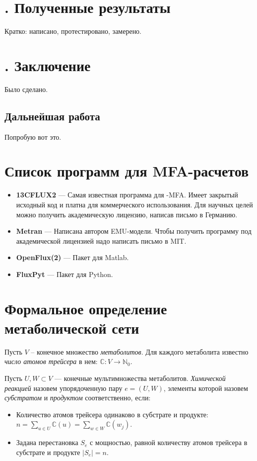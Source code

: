 \documentclass[14pt, a4paper]{extreport}
\begin{document}
\chapter[Полученные результаты]{\thechapter{}. Полученные результаты}
Кратко: написано, протестировано, замерено.

\chapter[Заключение]{\thechapter{}. Заключение}
Было сделано. 
\section{Дальнейшая работа}
Попробую вот это.


\begin{appendices}
	\chapter{Список программ для MFA-расчетов}
	\begin{itemize}
		\item \textbf{13CFLUX2} --- Самая известная программа для -MFA. Имеет закрытый исходный код и платна для коммерческого использования. Для научных целей можно получить академическую лицензию, написав письмо в Германию\cite{13CFLUX2}.
		
		\item \textbf{Metran} --- Написана автором EMU-модели. Чтобы получить программу под академической лицензией надо написать письмо в MIT.
		
		\item \textbf{OpenFlux(2)} --- Пакет для Matlab\cite{OpenFlux, OpenFlux2}.
		
		\item \textbf{FluxPyt} --- Пакет для Python\cite{FluxPyt}.
	\end{itemize}
	
	
	\chapter{Формальное определение \\метаболической сети}
	Пусть $V$ -- конечное множество \emph{метаболитов}. Для каждого метаболита известно \emph{число атомов трейсера} в нем: $\mathbb{C} \colon V \to \mathbb{N}_0$. 
	
	Пусть $U, W \subset V$ --- конечные мультимножества метаболитов. \emph{Химической реакцией} назовем упорядоченную пару $e = (U, W)$, элементы которой назовем \emph{субстратом} и \emph{продуктом} соответственно, если:
	\begin{itemize}
		\item Количество атомов трейсера одинаково в субстрате и продукте: \\ $n = \sum_{u \in U} \mathbb{C}(u) = \sum_{w \in W} \mathbb{C}(w_j)$. 
		\item Задана перестановка $S_e$ с мощностью, равной количеству атомов трейсера в субстрате и продукте $|S_e| = n$.
	\end{itemize}
	

\end{appendices}
\end{document}
